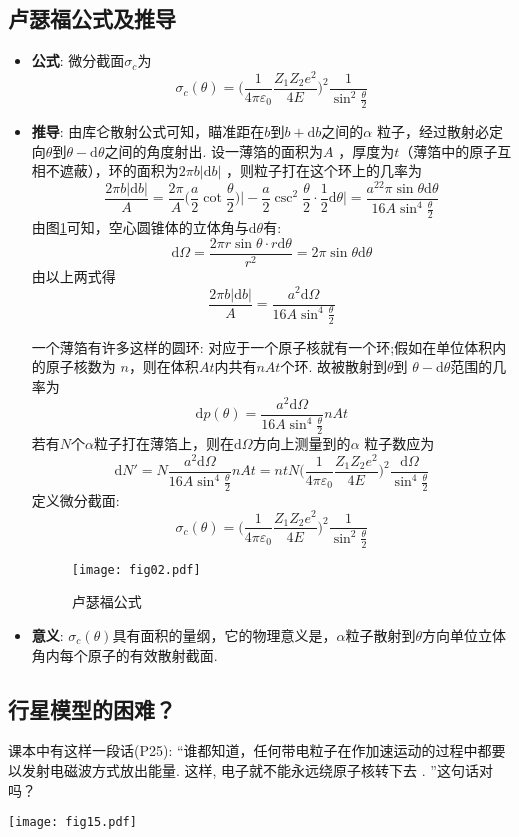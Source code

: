 \subsection{卢瑟福公式及推导}
\begin{itemize}
\item \textbf{公式}: 微分截面$\sigma_c$为
\[
\sigma_c(\theta)=\Big(\frac{1}{4\pi\varepsilon_0}\frac{Z_1Z_2e^2}{4E}\Big)^2\frac{1}{\sin^2\frac{\theta}{2}}
\]
\item \textbf{推导}: 由库仑散射公式可知，瞄准距在$b$到$b+\textrm{d}b$之间的$\alpha$
粒子，经过散射必定向$\theta$到$\theta-\textrm{d}\theta$之间的角度射出. 设一薄箔的面积为$A$
，厚度为$t$（薄箔中的原子互相不遮蔽），环的面积为$2\pi
b|\textrm{d}b|$ ，则粒子打在这个环上的几率为
\[
\frac{2\pi
b|\textrm{d}b|}{A}=\frac{2\pi}{A}\Big(\frac{a}{2}\cot\frac{\theta}{2}\Big)
\Big|-\frac{a}{2}\csc^2\frac{\theta}{2}\cdot\frac{1}{2}\textrm{d}\theta\Big|
=\frac{a^22\pi
\sin\theta\textrm{d}\theta}{16A\sin^4\frac{\theta}{2}}
\]
由图\ref{fig02}可知，空心圆锥体的立体角与$\textrm{d}\theta$有: 
\[
\textrm{d}\Omega=\frac{2\pi r\sin\theta\cdot
r\text{d}\theta}{r^2}=2\pi \sin\theta\textrm{d}\theta
\]
由以上两式得
\[
\frac{2\pi
b|\textrm{d}b|}{A}=\frac{a^2\textrm{d}\Omega}{16A\sin^4\frac{\theta}{2}}
\]

一个薄箔有许多这样的圆环: 对应于一个原子核就有一个环;假如在单位体积内的原子核数为
$n$，则在体积$At$内共有$nAt$个环. 故被散射到$\theta$到
$\theta-\textrm{d}\theta$范围的几率为
\[
\textrm{d}p(\theta)=\frac{a^2\textrm{d}\Omega}{16A\sin^4\frac{\theta}{2}}nAt
\]
若有$N$个$\alpha$粒子打在薄箔上，则在$\textrm{d}\Omega$方向上测量到的$\alpha$
粒子数应为
\[
\textrm{d}N'=N\frac{a^2\textrm{d}\Omega}{16A\sin^4\frac{\theta}{2}}nAt
=ntN\Big(\frac{1}{4\pi\varepsilon_0}\frac{Z_1Z_2e^2}{4E}\Big)^2\frac{\textrm{d}\Omega}{\sin^4\frac{\theta}{2}}
\]
定义微分截面: 
\[
\sigma_c(\theta)=\Big(\frac{1}{4\pi\varepsilon_0}\frac{Z_1Z_2e^2}{4E}\Big)^2\frac{1}{\sin^2\frac{\theta}{2}}
\]

\begin{figure}[!htb]
\centering
\texttt{[image: fig02.pdf]}
\caption{\label{fig02}卢瑟福公式}
\end{figure}
\item \textbf{意义}: $\sigma_c(\theta)$具有面积的量纲，它的物理意义是，$\alpha$粒子散射到$\theta$方向单位立体角内每个原子的有效散射截面. 
\end{itemize}

\subsection{行星模型的困难？}
\begin{multicols}{2} 
课本中有这样一段话(P25): ``谁都知道，任何带电粒子在作加速运动的过程中都要以发射电磁波方式放出能量. 这样, 电子就不能永远绕原子核转下去
. ''这句话对吗？

\begin{center}
\texttt{[image: fig15.pdf]}
\end{center}
\end{multicols}


